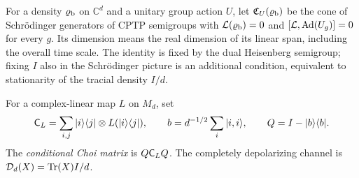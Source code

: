 \begin{definition}
\label{def:stationary-covariant-cone}
For a density $\varrho_{\mathrm b}$ on $\mathbb C^d$ and a unitary group action $U$, let
$\mathfrak C_U(\varrho_{\mathrm b})$ be the cone of Schr\"odinger generators of CPTP semigroups
with $\mathcal L(\varrho_{\mathrm b})=0$ and
$[\mathcal L,\operatorname{Ad}(U_g)]=0$ for every $g$. Its dimension means the real
dimension of its linear span, including the overall time scale.
The identity is fixed by the dual Heisenberg semigroup; fixing $I$ also in
the Schr\"odinger picture is an additional condition, equivalent to
stationarity of the tracial density $I/d$.
\end{definition}

\begin{definition}
\label{def:generator-choi}
For a complex-linear map $L$ on $M_d$, set
\[
 \mathsf C_L=\sum_{i,j}|i\rangle\langle j|\otimes L(|i\rangle\langle j|),
 \qquad b=d^{-1/2}\sum_i|i,i\rangle,\qquad Q=I-|b\rangle\langle b|.
\]
The \emph{conditional Choi matrix} is $Q\mathsf C_LQ$.
The completely depolarizing channel is
$\mathcal D_d(X)=\operatorname{Tr}(X)I/d$.
\end{definition}
